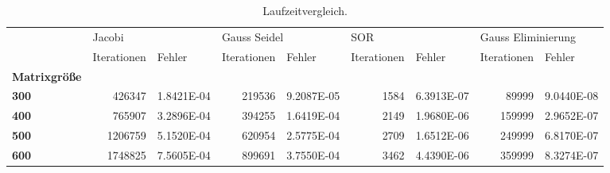 \begin{table}[h!]
\centering
\caption{Laufzeitvergleich.}
\label{laufzeit}
\begin{tabular}{lrlrlrlrl}
\toprule
{} & \multicolumn{2}{l}{Jacobi} & \multicolumn{2}{l}{Gauss Seidel} & \multicolumn{2}{l}{SOR} & \multicolumn{2}{l}{Gauss Eliminierung} \\
{} & Iterationen &      Fehler &  Iterationen &      Fehler & Iterationen &      Fehler &        Iterationen &      Fehler \\
\textbf{Matrixgröße} &             &             &              &             &             &             &                    &             \\
\midrule
\textbf{300        } &      426347 &  1.8421E-04 &       219536 &  9.2087E-05 &        1584 &  6.3913E-07 &              89999 &  9.0440E-08 \\
\textbf{400        } &      765907 &  3.2896E-04 &       394255 &  1.6419E-04 &        2149 &  1.9680E-06 &             159999 &  2.9652E-07 \\
\textbf{500        } &     1206759 &  5.1520E-04 &       620954 &  2.5775E-04 &        2709 &  1.6512E-06 &             249999 &  6.8170E-07 \\
\textbf{600        } &     1748825 &  7.5605E-04 &       899691 &  3.7550E-04 &        3462 &  4.4390E-06 &             359999 &  8.3274E-07 \\
\bottomrule
\end{tabular}
\end{table}
